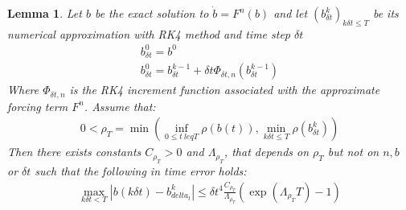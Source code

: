 \documentclass[12pt, a4paper]{article}
\theoremstyle{plain}
\newtheorem{lemma}[theorem]{Lemma}
\theoremstyle{definition}
\begin{document}
\begin{lemma}
  Let $b$ be the exact solution to $\dot{b} = F^n (b)$ and let $(b^k_{\delta t})_{k \delta t \leq T}$ be its numerical approximation with RK4 method and time step $\delta t$
  \begin{align}
    b^0_{\delta t} = b^0\\
    b^0_{\delta t} = b^{k-1}_{\delta t} + \delta t \Phi_{\delta t , n} (b^{k-1}_{\delta t})
  \end{align}
Where $\Phi_{\delta t, n}$ is the RK4 increment function associated with the approximate forcing term $F^n$.
Assume that:
\begin{align}
  0 < \rho_T = \min (\inf_{0 \leq t \ leq T} \rho(b(t)), \min_{k \delta t \leq T} \rho (b^k_{\delta t}))
\end{align}
Then there exists constants $C_{\rho_T}>0$ and $\Lambda_{\rho_T}$, that depends on $\rho_T$ but not on $n, b$ or $\delta t$ such that
the following in time error holds:
\begin{align}
  \max_{k \delta t < T} |b(k \delta t) - b^k_{delta_t}| \leq \delta t^4 \frac{C_{\rho_T}}{\Lambda_{\rho_T}} (\exp (\Lambda_{\rho_T} T)- 1)
\end{align}
\end{lemma}

\newpage
\printbibliography
\end{document}
